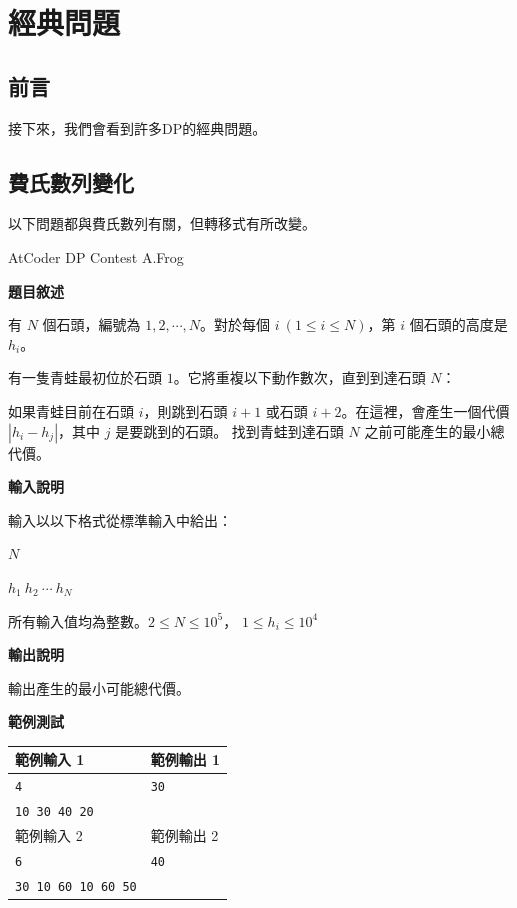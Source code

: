 \section{經典問題}
    \subsection{前言}
    接下來，我們會看到許多DP的經典問題。

    \subsection{費氏數列變化}
    以下問題都與費氏數列有關，但轉移式有所改變。

    \example AtCoder DP Contest A.Frog

    \textbf{題目敘述}

    有 $N$ 個石頭，編號為 $1,2,\cdots,N$。對於每個 $i \ (1 \le i \le N)$，第 $i$ 個石頭的高度是 $h_i$。

    有一隻青蛙最初位於石頭 $1$。它將重複以下動作數次，直到到達石頭 $N$：

    如果青蛙目前在石頭 $i$，則跳到石頭 $i+1$ 或石頭 $i+2$。在這裡，會產生一個代價 $|h_i - h_j|$，其中 $j$ 是要跳到的石頭。
    找到青蛙到達石頭 $N$ 之前可能產生的最小總代價。

    \textbf{輸入說明}

    輸入以以下格式從標準輸入中給出：

    $N$

    $h_1 \ h_2 \ \cdots \ h_N$

    所有輸入值均為整數。$2 \le N \le 10^5$，
    $1 \le h_i \le 10^4$

    \textbf{輸出說明}

    輸出產生的最小可能總代價。

    \textbf{範例測試}

    \begin{tabular}{|m{7cm}|m{7cm}|}
        \hline
        範例輸入 1 & 範例輸出 1 \\
        \hline
        \verb|4| & \verb|30| \\
        \verb|10 30 40 20| & \\
        \hline
        範例輸入 2 & 範例輸出 2 \\
        \hline
        \verb|6| & \verb|40| \\
        \verb|30 10 60 10 60 50| & \\
        \hline
    \end{tabular}

